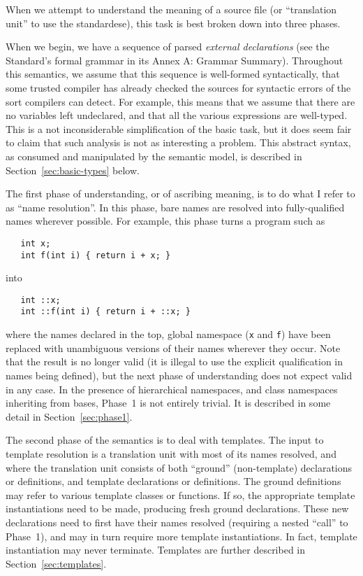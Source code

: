 \documentclass[11pt]{article}
\begin{document}
When we attempt to understand the meaning of a \cpp{} source file (or
``translation unit'' to use the standardese), this task is best broken
down into three phases.

When we begin, we have a sequence of parsed \emph{external
  declarations} (see the Standard's formal grammar in its Annex A:
Grammar Summary).  Throughout this semantics, we assume that this
sequence is well-formed syntactically, that some trusted compiler has
already checked the sources for syntactic errors of the sort compilers
can detect.  For example, this means that we assume that there are no
variables left undeclared, and that all the various expressions are
well-typed.  This is a not inconsiderable simplification of the basic
task, but it does seem fair to claim that such analysis is not as
interesting a problem.  This abstract syntax, as consumed and
manipulated by the semantic model, is described in
Section~\ref{sec:basic-types} below.

The first phase of understanding, or
of ascribing meaning, is to do what I refer to as ``name resolution''.
In this phase, bare names are resolved into fully-qualified names
wherever possible.  For example, this phase turns a program such as
\begin{verbatim}
   int x;
   int f(int i) { return i + x; }
\end{verbatim}
into
\begin{verbatim}
   int ::x;
   int ::f(int i) { return i + ::x; }
\end{verbatim}
where the names declared in the top, global namespace (\texttt{x} and
\texttt{f}) have been replaced with unambiguous versions of their
names wherever they occur.  Note that the result is no longer valid
\cpp{} (it is illegal to use the explicit qualification in names being
defined), but the next phase of understanding does not expect valid
\cpp{} in any case.  In the presence of hierarchical namespaces, and
class namespaces inheriting from bases, Phase~1 is not entirely
trivial.  It is described in some detail in Section~\ref{sec:phase1}.

 The second phase of the semantics is to deal with
templates.  The input to template resolution is a translation unit
with most of its names resolved, and where the translation unit
consists of both ``ground'' (non-template) declarations or
definitions, and template declarations or definitions.  The ground
definitions may refer to various template classes or functions.  If
so, the appropriate template instantiations need to be made, producing
fresh ground declarations.  These new declarations need to first have
their names resolved (requiring a nested ``call'' to Phase~1), and may
in turn require more template instantiations.  In fact, template
instantiation may never terminate.  Templates are further described in
Section~\ref{sec:templates}.
\end{document}
